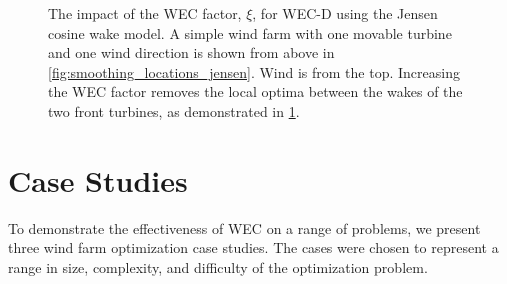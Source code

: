 \documentclass{jpconf}
\begin{document}
\begin{figure}[h!]
\begin{subfigure}[t]{0.47\textwidth}
		\caption{}
		\label{fig:smoothing_jensen_wec_d}
	\end{subfigure}
	\caption{The impact of the WEC factor, $\xi$, for WEC-D using the Jensen cosine wake model. A simple wind farm with one movable turbine and one wind direction is shown from above in \cref{fig:smoothing_locations_jensen}. Wind is from the top. Increasing the WEC factor removes the local optima between the wakes of the two front turbines, as demonstrated in \cref{fig:smoothing_jensen_wec_d}.}
	\label{fig:wec_jensen_wec_d}
\end{figure}

%

\section{Case Studies}\label{sec:casestudies}
To demonstrate the effectiveness of WEC on a range of problems, we present three wind farm optimization case studies. The cases were chosen to represent a range in size, complexity, and difficulty of the optimization problem.
\end{document}
